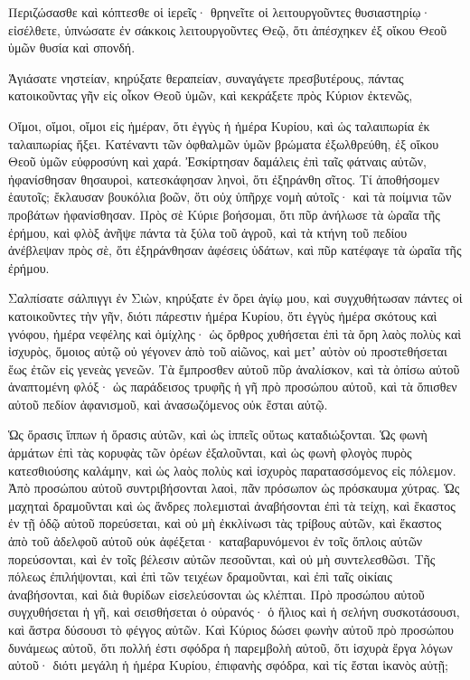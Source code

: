 \begin{spacing}{1.1}
\begin{multicols}{2}
Περιζώσασθε καὶ κόπτεσθε οἱ ἱερεῖς· θρηνεῖτε οἱ λειτουργοῦντες θυσιαστηρίῳ· εἰσέλθετε, ὑπνώσατε ἐν σάκκοις λειτουργοῦντες Θεῷ, ὅτι ἀπέσχηκεν ἐξ οἴκου Θεοῦ ὑμῶν θυσία καὶ σπονδή.

Ἁγιάσατε νηστείαν, κηρύξατε θεραπείαν, συναγάγετε πρεσβυτέρους, πάντας κατοικοῦντας γῆν εἰς οἶκον Θεοῦ ὑμῶν, καὶ κεκράξετε πρὸς Κύριον ἐκτενῶς,

Οἴμοι, οἴμοι, οἴμοι εἰς ἡμέραν, ὅτι ἐγγὺς ἡ ἡμέρα Κυρίου, καὶ ὡς ταλαιπωρία ἐκ ταλαιπωρίας ἥξει.
Κατέναντι τῶν ὀφθαλμῶν ὑμῶν βρώματα ἐξωλθρεύθη, ἐξ οἴκου Θεοῦ ὑμῶν εὐφροσύνη καὶ χαρά.
Ἐσκίρτησαν δαμάλεις ἐπὶ ταῖς φάτναις αὐτῶν, ἠφανίσθησαν θησαυροὶ, κατεσκάφησαν ληνοὶ, ὅτι ἐξηράνθη σῖτος.
Τί ἀποθήσομεν ἑαυτοῖς; ἔκλαυσαν βουκόλια βοῶν, ὅτι οὐχ ὑπῆρχε νομὴ αὐτοῖς· καὶ τὰ ποίμνια τῶν προβάτων ἠφανίσθησαν.
Πρὸς σὲ Κύριε βοήσομαι, ὅτι πῦρ ἀνήλωσε τὰ ὡραῖα τῆς ἐρήμου, καὶ φλὸξ ἀνῆψε πάντα τὰ ξύλα τοῦ ἀγροῦ,
καὶ τὰ κτήνη τοῦ πεδίου ἀνέβλεψαν πρὸς σὲ, ὅτι ἐξηράνθησαν ἀφέσεις ὑδάτων, καὶ πῦρ κατέφαγε τὰ ὡραῖα τῆς ἐρήμου.

Σαλπίσατε σάλπιγγι ἐν Σιὼν, κηρύξατε ἐν ὄρει ἁγίῳ μου, καὶ συγχυθήτωσαν πάντες οἱ κατοικοῦντες τὴν γῆν, διότι πάρεστιν ἡμέρα Κυρίου, ὅτι ἐγγὺς
ἡμέρα σκότους καὶ γνόφου, ἡμέρα νεφέλης καὶ ὁμίχλης· ὡς ὄρθρος χυθήσεται ἐπὶ τὰ ὄρη λαὸς πολὺς καὶ ἰσχυρὸς, ὅμοιος αὐτῷ οὐ γέγονεν ἀπὸ τοῦ αἰῶνος, καὶ μετʼ αὐτὸν οὐ προστεθήσεται ἕως ἐτῶν εἰς γενεὰς γενεῶν.
Τὰ ἔμπροσθεν αὐτοῦ πῦρ ἀναλίσκον, καὶ τὰ ὀπίσω αὐτοῦ ἀναπτομένη φλόξ· ὡς παράδεισος τρυφῆς ἡ γῆ πρὸ προσώπου αὐτοῦ, καὶ τὰ ὄπισθεν αὐτοῦ πεδίον ἀφανισμοῦ, καὶ ἀνασωζόμενος οὐκ ἔσται αὐτῷ.

Ὡς ὅρασις ἵππων ἡ ὅρασις αὐτῶν, καὶ ὡς ἱππεῖς οὕτως καταδιώξονται.
Ὡς φωνὴ ἁρμάτων ἐπὶ τὰς κορυφὰς τῶν ὀρέων ἐξαλοῦνται, καὶ ὡς φωνὴ φλογὸς πυρὸς κατεσθιούσης καλάμην, καὶ ὡς λαὸς πολὺς καὶ ἰσχυρὸς παρατασσόμενος εἰς πόλεμον.
Ἀπὸ προσώπου αὐτοῦ συντριβήσονται λαοὶ, πᾶν πρόσωπον ὡς πρόσκαυμα χύτρας.
Ὡς μαχηταὶ δραμοῦνται καὶ ὡς ἄνδρες πολεμισταὶ ἀναβήσονται ἐπὶ τὰ τείχη, καὶ ἕκαστος ἐν τῇ ὁδῷ αὐτοῦ πορεύσεται, καὶ οὐ μὴ ἐκκλίνωσι τὰς τρίβους αὐτῶν,
καὶ ἕκαστος ἀπὸ τοῦ ἀδελφοῦ αὐτοῦ οὐκ ἀφέξεται· καταβαρυνόμενοι ἐν τοῖς ὅπλοις αὐτῶν πορεύσονται, καὶ ἐν τοῖς βέλεσιν αὐτῶν πεσοῦνται, καὶ οὐ μὴ συντελεσθῶσι.
Τῆς πόλεως ἐπιλήψονται, καὶ ἐπὶ τῶν τειχέων δραμοῦνται, καὶ ἐπὶ ταῖς οἰκίαις ἀναβήσονται, καὶ διὰ θυρίδων εἰσελεύσονται ὡς κλέπται.
Πρὸ προσώπου αὐτοῦ συγχυθήσεται ἡ γῆ, καὶ σεισθήσεται ὁ οὐρανός· ὁ ἥλιος καὶ ἡ σελήνη συσκοτάσουσι, καὶ ἄστρα δύσουσι τὸ φέγγος αὐτῶν.
Καὶ Κύριος δώσει φωνὴν αὐτοῦ πρὸ προσώπου δυνάμεως αὐτοῦ, ὅτι πολλή ἐστι σφόδρα ἡ παρεμβολὴ αὐτοῦ, ὅτι ἰσχυρὰ ἔργα λόγων αὐτοῦ· διότι μεγάλη ἡ ἡμέρα Κυρίου, ἐπιφανὴς σφόδρα, καὶ τίς ἔσται ἱκανὸς αὐτῇ;


\end{multicols}
\end{spacing}

